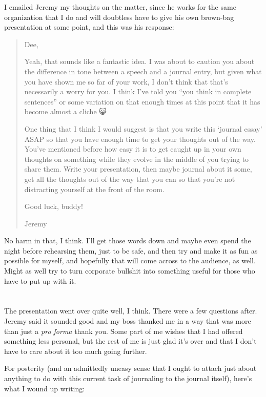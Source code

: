 I emailed Jeremy my thoughts on the matter, since he works for the same organization that I do and will doubtless have to give his own brown-bag presentation at some point, and this was his response:

\begin{quote}
Dee,

Yeah, that sounds like a fantastic idea. I was about to caution you about the difference in tone between a speech and a journal entry, but given what you have shown me so far of your work, I don't think that that's necessarily a worry for you. I think I've told you ``you think in complete sentences'' or some variation on that enough times at this point that it has become almost a cliche {\SmileyFont 😺}

One thing that I think I would suggest is that you write this `journal essay' ASAP so that you have enough time to get your thoughts out of the way. You've mentioned before how easy it is to get caught up in your own thoughts on something while they evolve in the middle of you trying to share them. Write your presentation, then maybe journal about it some, get all the thoughts out of the way that you can so that you're not distracting yourself at the front of the room.

Good luck, buddy!

Jeremy
\end{quote}

No harm in that, I think. I'll get those words down and maybe even spend the night before rehearsing them, just to be safe, and then try and make it as fun as possible for myself, and hopefully that will come across to the audience, as well. Might as well try to turn corporate bullshit into something useful for those who have to put up with it.

\section{}

The presentation went over quite well, I think. There were a few questions after. Jeremy said it sounded good and my boss thanked me in a way that was more than just a \emph{pro forma} thank you. Some part of me wishes that I had offered something less personal, but the rest of me is just glad it's over and that I don't have to care about it too much going further.

For posterity (and an admittedly uneasy sense that I ought to attach just about anything to do with this current task of journaling to the journal itself), here's what I wound up writing:

